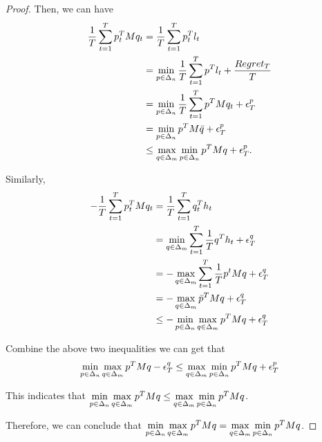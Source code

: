 \documentclass[../main.tex]{subfiles}
\begin{document}
\begin{proof}
		Then, we can have 
		\begin{equation*}
			\begin{aligned}
				\frac{1}{T} \sum\limits_{t=1}^T p_t^T M q_t & = \frac{1}{T} \sum\limits_{t=1}^T p_t^T l_t \\
				& = \min\limits_{p \in \Delta_n} \frac{1}{T} \sum\limits_{t=1}^T p^T l_t + \frac{Regret_T}{T} \\
				& = \min\limits_{p \in \Delta_n} \frac{1}{T} \sum\limits_{t=1}^T p^T M q_t + \epsilon_T^p \\
				& = \min\limits_{p \in \Delta_n} p^T M \bar{q} + \epsilon_T^p \\
				& \leq  \max\limits_{q \in \Delta_m} 	\min\limits_{p \in \Delta_n} p^T M q + \epsilon_T^p.
  			\end{aligned}
		\end{equation*}
		
		Similarly, 
		\begin{equation*}
			\begin{aligned}
				-\frac{1}{T} \sum\limits_{t=1}^T p_t^T M q_t & = \frac{1}{T} \sum\limits_{t=1}^T q_t^T h_t \\
				& = \min\limits_{q \in \Delta_m}\sum\limits_{t=1}^T \frac{1}{T}q^T h_t + \epsilon_T^q \\
				& = -\max\limits_{q \in \Delta_m} \sum\limits_{t=1}^T \frac{1}{T}p^t M q  + \epsilon_T^q \\
				& = -\max\limits_{q \in \Delta_m} \bar{p}^T M q  + \epsilon_T^q \\
				& \leq - \min\limits_{p \in \Delta_n} \max\limits_{q \in \Delta_m} p^T M q  + \epsilon_T^q \\
			\end{aligned}
		\end{equation*}
		
		Combine the above two inequalities  we can get that 
		\begin{equation*}
		\min\limits_{p \in \Delta_n} \max\limits_{q \in \Delta_m} p^T M q  - \epsilon_T^q  \leq \max\limits_{q \in \Delta_m} 	\min\limits_{p \in \Delta_n} p^T M q + \epsilon_T^p
		\end{equation*}
		
		This indicates that $\min\limits_{p \in \Delta_n} \max\limits_{q \in \Delta_m} p^T M q \leq \max\limits_{q \in \Delta_m} 	\min\limits_{p \in \Delta_n} p^T M q$.
		
		Therefore, we can conclude that  $\min\limits_{p \in \Delta_n} \max\limits_{q \in \Delta_m} p^T M q = \max\limits_{q \in \Delta_m} 	\min\limits_{p \in \Delta_n} p^T M q$.
	\end{proof}
\end{document}
